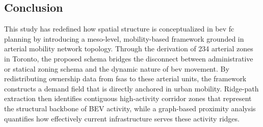 



\subsection{Conclusion}
\label{sec:conclusion}
This study has redefined how spatial structure is conceptualized in \gls{bev} \gls{fc} planning by introducing a meso-level, mobility-based framework grounded in arterial mobility network topology. Through the derivation of 234 arterial zones in Toronto, the proposed schema bridges the disconnect between administrative or statical zoning schema and the dynamic nature of \gls{bev} movement. By redistributing ownership data from \glspl{fsa} to these arterial units, the framework constructs a demand field that is directly anchored in urban mobility. Ridge-path extraction then identifies contiguous high-activity corridor zones that represent the structural backbone of BEV activity, while a graph-based proximity analysis quantifies how effectively current infrastructure serves these activity ridges.

